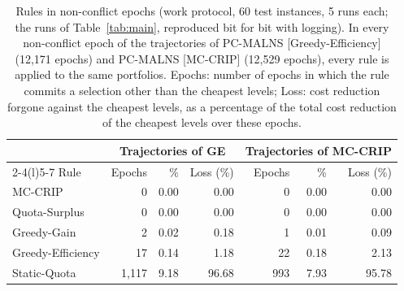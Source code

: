 \begin{table}[pos=H]
\centering
\caption{Rules in non-conflict epochs (work protocol, 60 test instances, 5 runs each; the runs of Table~\ref{tab:main}, reproduced bit for bit with logging). In every non-conflict epoch of the trajectories of PC-MALNS [Greedy-Efficiency] (12,171 epochs) and PC-MALNS [MC-CRIP] (12,529 epochs), every rule is applied to the same portfolios. Epochs: number of epochs in which the rule commits a selection other than the cheapest levels; Loss: cost reduction forgone against the cheapest levels, as a percentage of the total cost reduction of the cheapest levels over these epochs.}
\label{tab:cfall}
\footnotesize
\begin{tabular}{@{}lrrrrrr@{}}
\toprule
 & \multicolumn{3}{c}{Trajectories of GE} & \multicolumn{3}{c}{Trajectories of MC-CRIP} \\
\cmidrule(lr){2-4}\cmidrule(l){5-7}
Rule & Epochs & \% & Loss (\%) & Epochs & \% & Loss (\%) \\
\midrule
MC-CRIP & 0 & 0.00 & 0.00 & 0 & 0.00 & 0.00 \\
Quota-Surplus & 0 & 0.00 & 0.00 & 0 & 0.00 & 0.00 \\
Greedy-Gain & 2 & 0.02 & 0.18 & 1 & 0.01 & 0.09 \\
Greedy-Efficiency & 17 & 0.14 & 1.18 & 22 & 0.18 & 2.13 \\
Static-Quota & 1,117 & 9.18 & 96.68 & 993 & 7.93 & 95.78 \\
\bottomrule
\end{tabular}
\end{table}
